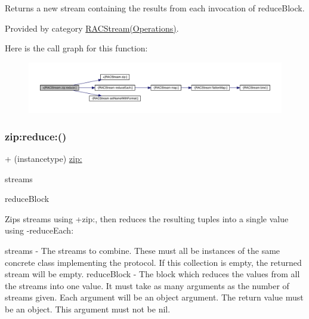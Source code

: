 Returns a new stream containing the results from each invocation of {\ttfamily reduce\+Block}. 

Provided by category \mbox{\hyperlink{category_r_a_c_stream_07_operations_08_aba7b1d8c9ac130afad52b0baca8ae016}{R\+A\+C\+Stream(\+Operations)}}.

Here is the call graph for this function\+:\nopagebreak
\begin{figure}[H]
\begin{center}
\leavevmode
\includegraphics[width=350pt]{interface_r_a_c_stream_aba7b1d8c9ac130afad52b0baca8ae016_cgraph}
\end{center}
\end{figure}
\mbox{\label{interface_r_a_c_stream_aba7b1d8c9ac130afad52b0baca8ae016}} 
\subsubsection{\texorpdfstring{zip\+:reduce\+:()}{zip:reduce:()}\hspace{0.1cm}{\footnotesize\ttfamily [3/3]}}
{\footnotesize\ttfamily + (instancetype) \mbox{\hyperlink{category_r_a_c_stream_07_operations_08_a90ef5f217dc285dc831cc0d45166a529}{zip\+:}} \begin{DoxyParamCaption}\item[{(id$<$ N\+S\+Fast\+Enumeration $>$)}]{streams }\item[{reduce:(id($^\wedge$)())}]{reduce\+Block }\end{DoxyParamCaption}}

Zips streams using +zip\+:, then reduces the resulting tuples into a single value using -\/reduce\+Each\+:

streams -\/ The streams to combine. These must all be instances of the same concrete class implementing the protocol. If this collection is empty, the returned stream will be empty. reduce\+Block -\/ The block which reduces the values from all the streams into one value. It must take as many arguments as the number of streams given. Each argument will be an object argument. The return value must be an object. This argument must not be nil.

